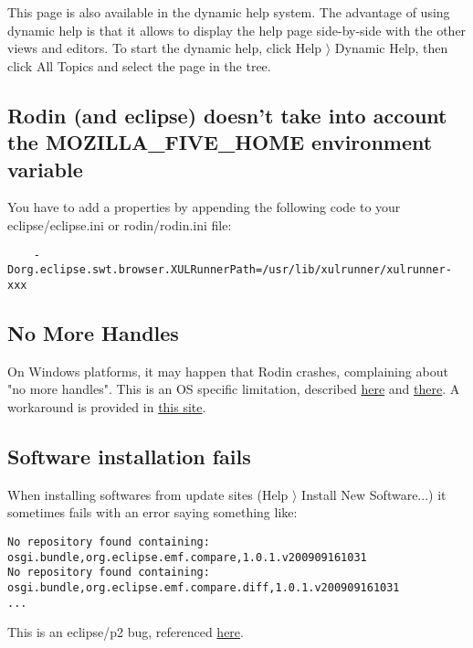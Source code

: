 This page is also available in the dynamic help system. The advantage of using dynamic help is that it allows to display the help page side-by-side with the other views and editors. To start the dynamic help, click \textsf{Help $\rangle$ Dynamic Help}, then click \textsf{All Topics} and select the page in the tree. 

\subsection{Rodin (and eclipse) doesn't take into account the MOZILLA_FIVE_HOME environment variable}

You have to add a properties by appending the following code to your \textsf{eclipse/eclipse.ini} or \textsf{rodin/rodin.ini} file: 

\begin{verbatim} 
	-Dorg.eclipse.swt.browser.XULRunnerPath=/usr/lib/xulrunner/xulrunner-xxx 
\end{verbatim} 

\subsection{No More Handles}

On Windows platforms, it may happen that Rodin crashes, complaining about "no more handles". This is an OS specific limitation, described \href{http://journals.jevon.org/users/jevon-phd/entry/19833}{here} and \href{https://bugs.eclipse.org/bugs/show_bug.cgi?id=211124}{there}. A workaround is provided in \href{http://blogs.msdn.com/b/ntdebugging/archive/2007/01/04/desktop-heap-overview.aspx}{this site}. 

\subsection{Software installation fails}

When installing softwares from update sites (\textsf{Help $\rangle$ Install New Software...}) it sometimes fails with an error saying something like: 

\begin{verbatim}
No repository found containing: osgi.bundle,org.eclipse.emf.compare,1.0.1.v200909161031
No repository found containing: osgi.bundle,org.eclipse.emf.compare.diff,1.0.1.v200909161031
...
\end{verbatim}

This is an eclipse/p2 bug, referenced \href{http://stackoverflow.com/questions/511367/error-when-updating-eclipse}{here}. 

